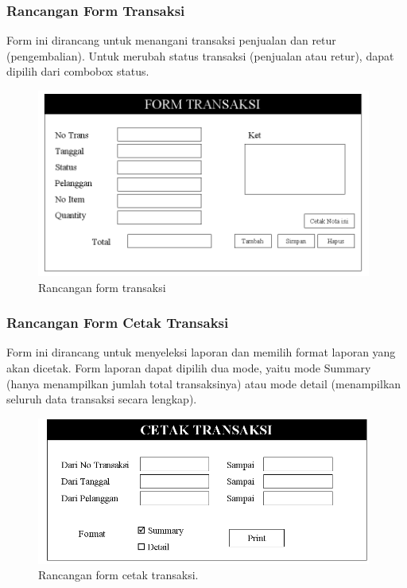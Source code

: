\documentclass{article}
\begin{document}
\subsubsection{Rancangan Form Transaksi}
Form ini dirancang untuk menangani transaksi penjualan dan retur (pengembalian). Untuk merubah status transaksi (penjualan atau retur), dapat dipilih dari combobox status.
\begin{figure}[htp]
    \centering
    \includegraphics[width=11cm]{gambar_3_4.png}
    \caption{Rancangan form transaksi}
    \label{fig:my_label4}
\end{figure}
\newpage

\subsubsection{Rancangan Form Cetak Transaksi}
Form ini dirancang untuk menyeleksi laporan dan memilih format laporan yang akan dicetak. Form laporan dapat dipilih dua mode, yaitu mode Summary (hanya menampilkan jumlah total transaksinya) atau mode detail (menampilkan seluruh data transaksi secara lengkap).
\begin{figure}[htp]
    \centering
    \includegraphics[width=11cm]{gambar_3_5.png}
    \caption{ Rancangan form cetak transaksi.}
    \label{fig:my_label5}
\end{figure}
\end{document}
